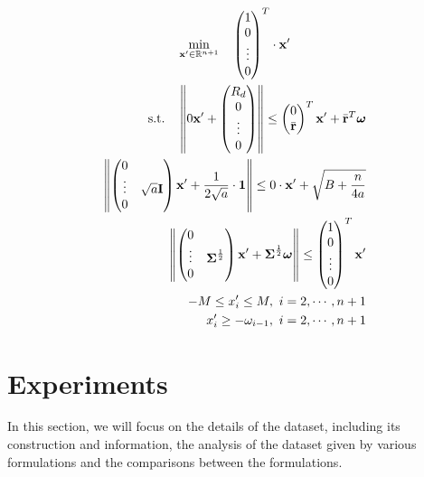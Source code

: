 \documentclass[12pt]{ftec2101}
\newcommand{\matr}[1]{\mathbf{#1}}
\newcommand{\vect}[1]{\mathbf{#1}}
\begin{document}
\begin{gather}
    \min_{\vect{x'} \in \mathbb{R}^{n+1}} \quad \begin{pmatrix}
        1 \\
        0 \\
        \vdots \\
        0
    \end{pmatrix}^T
    \cdot \vect{x'}\\
    \begin{aligned}
    \textup{s.t.} \quad  \left \Vert 0 \vect{x'} + 
    \begin{pmatrix}
        R_d\\
        0\\
        \vdots\\
        0
    \end{pmatrix} \right \Vert \leq
    \begin{pmatrix}
        0\\
        \bar{\vect{r}}
    \end{pmatrix}^T \vect{x'} + \bar{\vect{r}}^T \boldsymbol{\omega}\\
    \left \Vert 
    \begin{pmatrix}
        0 & \\
        \vdots & \sqrt{a} \matr{I} \\
        0 & 
    \end{pmatrix}\vect{x'} + \frac{1}{2\sqrt{a}} \cdot \vect{1} \right \Vert \leq 0 \cdot \vect{x'} + \sqrt{B+\frac{n}{4a}}\\
    \left \Vert
    \begin{pmatrix}
        0 & \\
        \vdots & \boldsymbol{\Sigma}^{\frac{1}{2}}\\
        0 & 
    \end{pmatrix} \vect{x'} + \boldsymbol{\Sigma}^{\frac{1}{2}} \boldsymbol{\omega} \right \Vert \leq
    \begin{pmatrix}
        1 \\
        0 \\
        \vdots \\
        0
    \end{pmatrix}^T \vect{x'}\\
    -M \leq x'_i \leq M,\ i=2,\cdots,n+1 \\
    x'_i \geq - \omega_{i - 1},\ i=2,\cdots,n+1
    \end{aligned}
\end{gather}
\section{Experiments}
In this section, we will focus on the details of the dataset, including its construction and information, the analysis of the dataset given by various formulations and the comparisons between the formulations.
\end{document}
